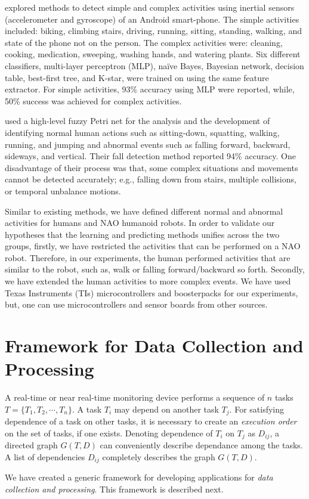 \documentclass{IEEEtran}
\begin{document}
\cite{DernbachActivityAndFallDetectionPhone2012} explored methods to detect simple and complex activities using inertial 
sensors (accelerometer and gyroscope) of an Android smart-phone. The simple activities included: 
biking, climbing stairs, driving, running, sitting, standing, walking, and state of the phone not 
on the person. The complex activities were: cleaning, cooking, medication, sweeping, washing hands, 
and watering plants. Six different classifiers, multi-layer  perceptron (MLP), na\"{i}ve  Bayes,  
Bayesian  network,  decision  table,  best-first tree, and  K-star,  were trained on using the same 
feature extractor. For simple activities, 93\% accuracy using MLP were reported, while, 50\% 
success was achieved for complex activities.    

\cite{ShenFallDetectionPhone2015} used a  high-level fuzzy Petri net for the analysis and the development of 
identifying normal human actions such as sitting-down, squatting, walking, running, and jumping and 
abnormal events such as falling forward, backward, sideways, and vertical. Their fall detection 
method reported 94\% accuracy. One disadvantage of their process was that, some complex situations 
and movements cannot be detected accurately; e.g., falling down from  stairs, multiple collisions, 
or temporal unbalance motions.

Similar to existing methods, we have defined different normal and abnormal activities for humans 
and NAO humanoid robots. In order to validate our hypotheses that the learning and predicting 
methods unifies across the two groups, firstly, we have restricted the activities that can be 
performed on a NAO robot. Therefore, in our experiments, the human performed activities that are 
similar to the robot, such as, walk or falling forward/backward so forth. Secondly, we have 
extended the human activities to more complex events.  We have used Texas Instruments 
(TIs)  microcontrollers and boosterpacks for our experiments, 
but, one can use microcontrollers and  sensor boards from other sources.  


\section{Framework for Data Collection and Processing}
\label{sec:framework}

A real-time or near real-time monitoring device performs a sequence of $n$ tasks $T = \{ T_1, T_2,\cdots,T_n\}$. A task $T_i$ may depend on another task $T_j$.  For satisfying dependence of a task on other tasks, it is necessary to create an \emph{execution order} on the set of tasks, if one exists. Denoting dependence of $T_i$ on $T_j$ as $D_{ij}$, a directed graph $G(T,D)$ can conveniently describe dependance among the tasks. A list of dependencies $D_{ij}$ completely describes the graph $G(T,D)$.
\par
We have created a generic framework for developing applications for \emph{data collection and processing}. This framework is described next.
\end{document}
